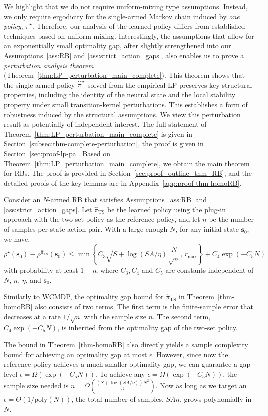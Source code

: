 \documentclass[mnsc,nonblindrev]{informs3}
\newcommand{\pihbst}{\widehat{\Bar{\pi}}^\star}
\newcommand{\pihts}{\widehat{\pi}_{\mathrm{TS}}}
\newcommand{\bms}{\bm{s}}
\begin{document}
We highlight that we do not require uniform-mixing type assumptions.
Instead, we only require ergodicity for the single-armed Markov chain induced by \emph{one policy}, $\bar\pi^\star$.
Therefore, our analysis of the learned policy differs from established techniques based on uniform mixing.
Interestingly, the assumptions that allow for an exponentially small optimality gap, after slightly strengthened into our Assumptions~\ref{ass:RB} and \ref{ass:strict_action_gaps}, also enables us to prove a \emph{perturbation analysis theorem} (Theorem~\ref{thm:LP_perturbation_main_complete}).
This theorem shows that the single-armed policy $\pihbst$ solved from the empirical LP preserves key structural properties, including the identity of the neutral state and the local stability property under small transition-kernel perturbations.
This establishes a form of robustness induced by the structural assumptions.
We view this perturbation result as potentially of independent interest. The full statement of Theorem~\ref{thm:LP_perturbation_main_complete} is given in Section~\ref{subsec:thm-complete-perturbation}, the proof is given in Section~\ref{sec:proof-lp-pa}.
Based on Theorem~\ref{thm:LP_perturbation_main_complete}, we obtain the main theorem for RBs. The proof is provided in Section~\ref{sec:proof_outline_thm_RB}, and the detailed proofs of the key lemmas are in Appendix~\ref{app:proof-thm-homoRB}.
\begin{theorem}\label{thm-homoRB}
Consider an $N$-armed RB that satisfies Assumptions~\ref{ass:RB} and \ref{ass:strict_action_gaps}.
Let $\pihts$ be the learned policy using the plug-in approach with the two-set policy as the reference policy, and let $n$ be the number of samples per state-action pair.
With a large enough $N$, for any initial state $\bms_0$, we have,
\[
\rho^{\star}(\bms_0) - \rho^{\pihts}(\bms_0) \le \min\left\{C_3\sqrt{S + \log (SA/\eta)}\frac{N}{\sqrt{n}}, \, r_{\max}\right\}+C_4\exp(-C_5N)
\]
with probability at least $1 - \eta$,
where $C_3,C_4$ and $C_5$ are constants independent of $N$, $n$, $\eta$, and $\bms_0$.
\end{theorem}


Similarly to WCMDP, the optimality gap bound for $\pihts$ in Theorem~\ref{thm-homoRB} also consists of two terms.
The first term is the finite-sample error that decreases at a rate $1/{\sqrt{n}}$ with the sample size $n$.
The second term, $C_4\exp(-C_5N)$, is inherited from the optimality gap of the two-set policy.


The bound in Theorem~\ref{thm-homoRB} also directly yields a sample complexity bound for achieving an optimality gap at most $\epsilon$.
However, since now the reference policy achieves a much smaller optimality gap, we can guarantee a gap level $\epsilon=\Omega(\exp(-C_5N))$.
To achieve any $\epsilon=\Omega(\exp(-C_5N))$, the sample size needed is $n=\Omega\left(\frac{(S + \log (SA/\eta))N^2}{\epsilon^2}\right)$.
Now as long as we target an $\epsilon=\Theta(1/\textrm{poly}(N))$, the total number of samples, $SAn$, grows polynomially in $N$.
\end{document}
